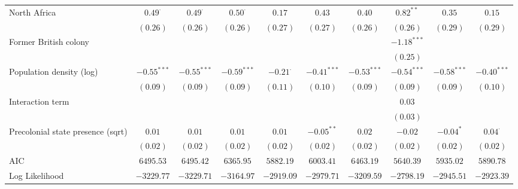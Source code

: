 \begin{sidewaystable}
\begin{center}
{\begin{tabular}{l c c c c c c c c c}
North Africa                          & $0.49^{\cdot}$ & $0.49^{\cdot}$ & $0.50^{\cdot}$ & $0.17$          & $0.43$        & $0.40$        & $0.82^{**}$     & $0.35$          & $0.15$         \\
                                      & $(0.26)$       & $(0.26)$       & $(0.26)$       & $(0.27)$        & $(0.27)$      & $(0.26)$      & $(0.26)$        & $(0.29)$        & $(0.29)$       \\
Former British colony                 &                &                &                &                 &               &               & $-1.18^{***}$   &                 &                \\
                                      &                &                &                &                 &               &               & $(0.25)$        &                 &                \\
Population density (log)              & $-0.55^{***}$  & $-0.55^{***}$  & $-0.59^{***}$  & $-0.21^{\cdot}$ & $-0.41^{***}$ & $-0.53^{***}$ & $-0.54^{***}$   & $-0.58^{***}$   & $-0.40^{***}$  \\
                                      & $(0.09)$       & $(0.09)$       & $(0.09)$       & $(0.11)$        & $(0.10)$      & $(0.09)$      & $(0.09)$        & $(0.09)$        & $(0.10)$       \\
Interaction term                      &                &                &                &                 &               &               & $0.03$          &                 &                \\
                                      &                &                &                &                 &               &               & $(0.03)$        &                 &                \\
Precolonial state presence (sqrt)     & $0.01$         & $0.01$         & $0.01$         & $0.01$          & $-0.05^{**}$  & $0.02$        & $-0.02$         & $-0.04^{*}$     & $0.04^{\cdot}$ \\
                                      & $(0.02)$       & $(0.02)$       & $(0.02)$       & $(0.02)$        & $(0.02)$      & $(0.02)$      & $(0.02)$        & $(0.02)$        & $(0.02)$       \\
\midrule
AIC                                   & $6495.53$      & $6495.42$      & $6365.95$      & $5882.19$       & $6003.41$     & $6463.19$     & $5640.39$       & $5935.02$       & $5890.78$      \\
Log Likelihood                        & $-3229.77$     & $-3229.71$     & $-3164.97$     & $-2919.09$      & $-2979.71$    & $-3209.59$    & $-2798.19$      & $-2945.51$      & $-2923.39$     \\

\end{tabular}}
\end{center}
\end{sidewaystable}
